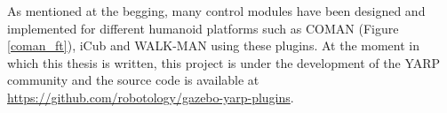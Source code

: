 As mentioned at the begging, many control modules have been designed and implemented for different humanoid platforms such as COMAN (Figure \ref{coman_ft}), iCub and WALK-MAN using these plugins. At the moment in which this thesis is written, this project is under the development of the YARP community and the source code is available at \url{https://github.com/robotology/gazebo-yarp-plugins}.
